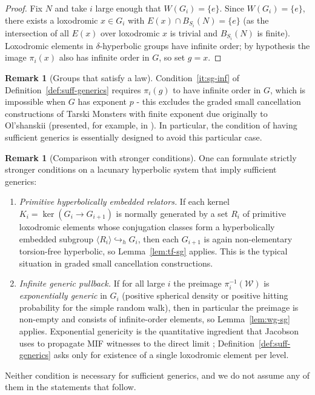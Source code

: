 \documentclass[12pt]{amsart}
\theoremstyle{plain}
\theoremstyle{definition}
\newtheorem{remark}[theorem]{Remark}
\begin{document}
\begin{proof}
Fix $N$ and take $i$ large enough that $W(G_i) = \{e\}$.
Since $W(G_i) = \{e\}$, there exists a loxodromic $x \in G_i$ with
$E(x) \cap B_{S_i}(N) = \{e\}$ (as the intersection of all $E(x)$ over loxodromic
$x$ is trivial and $B_{S_i}(N)$ is finite).
Loxodromic elements in $\delta$-hyperbolic groups have infinite order; by hypothesis
the image $\pi_i(x)$ also has infinite order in $G$, so set $g = x$.
\end{proof}

\begin{remark}[Groups that satisfy a law]\label{rem:tm}
Condition~\ref{it:sg-inf} of Definition~\ref{def:suff-generics} requires
$\pi_i(g)$ to have infinite order in $G$, which is impossible when $G$ has
exponent $p$ - this excludes the graded small cancellation constructions of Tarski Monsters with finite exponent due originally to Ol'shanskii \cite{O82} (presented, for example, in \cite[Theorem 4.26(2), Remark 4.27]{OOS}). 
In particular, the condition of having sufficient generics is essentially designed to avoid this particular case.
\end{remark}

\begin{remark}[Comparison with stronger conditions]\label{rem:sg-comparison}
One can formulate strictly stronger conditions on a lacunary hyperbolic system
that imply sufficient generics:
\begin{enumerate}[label=(\alph*)]
  \item \textit{Primitive hyperbolically embedded relators.}
  If each kernel $K_i = \ker(G_i \to G_{i+1})$ is normally generated by a set
  $R_i$ of primitive loxodromic elements whose conjugation classes form a
  hyperbolically embedded subgroup $\langle R_i\rangle \hookrightarrow_h G_i$,
  then each $G_{i+1}$ is again non-elementary torsion-free hyperbolic, so
  Lemma~\ref{lem:tf-sg} applies.  This is the typical situation in graded small
  cancellation constructions.

  \item \textit{Infinite generic pullback.}
  If for all large $i$ the preimage $\pi_i^{-1}(\mathcal{W})$ is
  \emph{exponentially generic} in $G_i$ (positive spherical density or positive
  hitting probability for the simple random walk), then in particular the
  preimage is non-empty and consists of infinite-order elements, so
  Lemma~\ref{lem:wg-sg} applies.  Exponential genericity is the quantitative
  ingredient that Jacobson uses to propagate MIF witnesses to the direct limit \cite{Jac};
  Definition~\ref{def:suff-generics} asks only for existence of a single
  loxodromic element per level.
\end{enumerate}
Neither condition is necessary for sufficient generics, and we do not assume any
of them in the statements that follow.
\end{remark}
\end{document}
